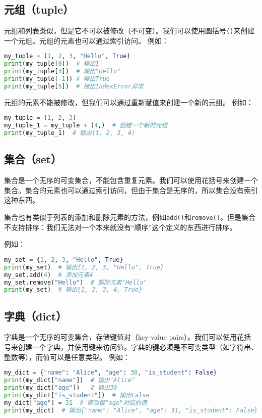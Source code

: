 \documentclass[../main.tex]{subfiles}
\begin{document}
\subsection{元组（tuple）}
元组和列表类似，但是它不可以被修改（不可变）。我们可以使用圆括号\texttt{()}来创建一个元组。元组的元素也可以通过索引访问。
例如：
\begin{lstlisting}[language=python]
my_tuple = (1, 2, 3, "Hello", True)
print(my_tuple[0])  # 输出1
print(my_tuple[3])  # 输出"Hello"
print(my_tuple[-1]) # 输出True
print(my_tuple[5])  # 抛出IndexError异常
\end{lstlisting}

元组的元素不能被修改，但我们可以通过重新赋值来创建一个新的元组。
例如：
\begin{lstlisting}[language=python]
my_tuple = (1, 2, 3)
my_tuple_1 = my_tuple + (4,)  # 创建一个新的元组
print(my_tuple_1)  # 输出(1, 2, 3, 4)
\end{lstlisting}

\subsection{集合（set）}
集合是一个无序的可变集合，不能包含重复元素。我们可以使用花括号\texttt{{}}来创建一个集合。集合的元素也可以通过索引访问，但由于集合是无序的，所以集合没有索引这种东西。

集合也有类似于列表的添加和删除元素的方法，例如\texttt{add()}和\texttt{remove()}。但是集合不支持排序：我们无法对一个本来就没有“顺序”这个定义的东西进行排序。

例如：
\begin{lstlisting}[language=python]
my_set = {1, 2, 3, "Hello", True}
print(my_set)  # 输出{1, 2, 3, "Hello", True}
my_set.add(4)  # 添加元素4
my_set.remove("Hello")  # 删除元素"Hello"
print(my_set)  # 输出{1, 2, 3, 4, True}
\end{lstlisting}

\subsection{字典（dict）}
字典是一个无序的可变集合，存储键值对（key-value pairs）。我们可以使用花括号\texttt{{}}来创建一个字典，并使用键来访问值。字典的键必须是不可变类型（如字符串、整数等），而值可以是任意类型。
例如：
\begin{lstlisting}[language=python]
my_dict = {"name": "Alice", "age": 30, "is_student": False}
print(my_dict["name"])  # 输出"Alice"
print(my_dict["age"])   # 输出30
print(my_dict["is_student"])  # 输出False
my_dict["age"] = 31  # 修改键"age"对应的值
print(my_dict)  # 输出{"name": "Alice", "age": 31, "is_student": False}
\end{lstlisting}
\end{document}
